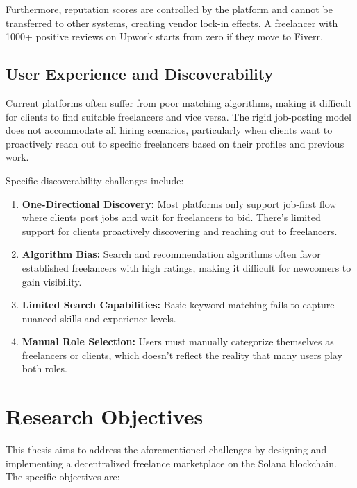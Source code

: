 \documentclass[a4paper,13pt,twoside]{report}
\theoremstyle{definition}
\begin{document}
Furthermore, reputation scores are controlled by the platform and cannot be transferred to other systems, creating vendor lock-in effects. A freelancer with 1000+ positive reviews on Upwork starts from zero if they move to Fiverr.

\subsection{User Experience and Discoverability}

Current platforms often suffer from poor matching algorithms, making it difficult for clients to find suitable freelancers and vice versa. The rigid job-posting model does not accommodate all hiring scenarios, particularly when clients want to proactively reach out to specific freelancers based on their profiles and previous work.

Specific discoverability challenges include:

\begin{enumerate}
    \item \textbf{One-Directional Discovery:} Most platforms only support job-first flow where clients post jobs and wait for freelancers to bid. There's limited support for clients proactively discovering and reaching out to freelancers.

    \item \textbf{Algorithm Bias:} Search and recommendation algorithms often favor established freelancers with high ratings, making it difficult for newcomers to gain visibility.

    \item \textbf{Limited Search Capabilities:} Basic keyword matching fails to capture nuanced skills and experience levels.

    \item \textbf{Manual Role Selection:} Users must manually categorize themselves as freelancers or clients, which doesn't reflect the reality that many users play both roles.
\end{enumerate}

\section{Research Objectives}

This thesis aims to address the aforementioned challenges by designing and implementing a decentralized freelance marketplace on the Solana blockchain. The specific objectives are:
\end{document}
